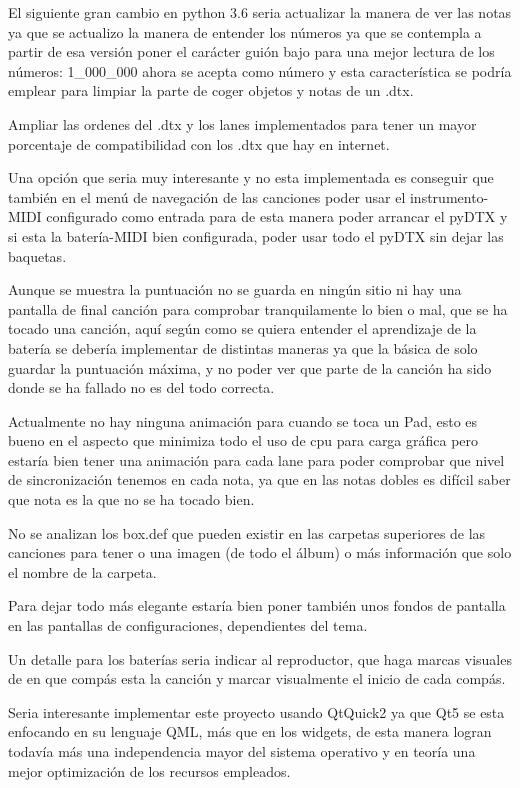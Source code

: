 \documentclass[a4paper,11pt,oneside]{book}
\begin{document}
El siguiente gran cambio en python 3.6 seria actualizar la manera de ver las notas ya que se actualizo la manera de entender los números ya que se contempla a partir de esa versión poner el carácter guión bajo para una mejor lectura de los números: 1\_000\_000 ahora se acepta como número y esta característica se podría emplear para limpiar la parte de coger objetos y notas de un .dtx.

Ampliar las ordenes del .dtx y los lanes implementados para tener un mayor porcentaje de compatibilidad con los .dtx que hay en internet.

Una opción que seria muy interesante y no esta implementada es conseguir que también en el menú de navegación de las canciones poder usar el instrumento-MIDI configurado como entrada para de esta manera poder arrancar el pyDTX y si esta la batería-MIDI bien configurada, poder usar todo el pyDTX sin dejar las baquetas.

Aunque se muestra la puntuación no se guarda en ningún sitio ni hay una pantalla de final canción para comprobar tranquilamente lo bien o mal, que se ha tocado una canción, aquí según como se quiera entender el aprendizaje de la batería se debería implementar de distintas maneras ya que la básica de solo guardar la puntuación máxima, y no poder ver que parte de la canción ha sido donde se ha fallado no es del todo correcta.

Actualmente no hay ninguna animación para cuando se toca un Pad, esto es bueno en el aspecto que minimiza todo el uso de cpu para carga gráfica pero estaría bien tener una animación para cada lane para poder comprobar que nivel de sincronización tenemos en cada nota, ya que en las notas dobles es difícil saber que nota es la que no se ha tocado bien.

No se analizan los box.def que pueden existir en las carpetas superiores de las canciones para tener o una imagen (de todo el álbum) o más información que solo el nombre de la carpeta.

Para dejar todo más elegante estaría bien poner también unos fondos de pantalla en las pantallas de configuraciones, dependientes del tema.

Un detalle para los baterías seria indicar al reproductor, que haga marcas visuales de en que compás esta la canción y marcar visualmente el inicio de cada compás.

Seria interesante implementar este proyecto usando QtQuick2 ya que Qt5 se esta enfocando en su lenguaje QML, más que en los widgets, de esta manera logran todavía más una independencia mayor del sistema operativo y en teoría una mejor optimización de los recursos empleados.
\end{document}
